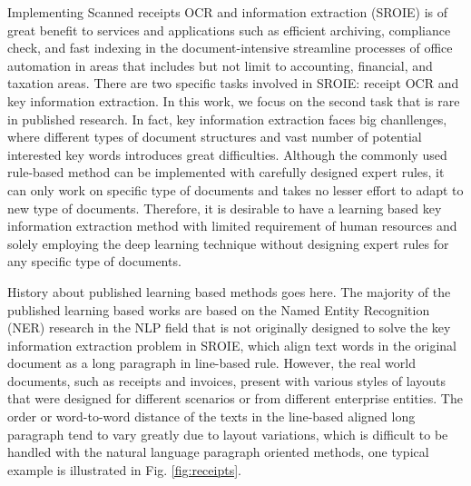 \documentclass[10pt,twocolumn,letterpaper]{article}
\begin{document}
Implementing Scanned receipts OCR and information extraction (SROIE) is of great benefit to services and applications such as efficient archiving, compliance check, and fast indexing in the document-intensive streamline processes of office automation in areas that includes but not limit to accounting, financial, and taxation areas. There are two specific tasks involved in SROIE: receipt OCR and key information extraction. In this work, we focus on the second task that is rare in published research. In fact, key information extraction faces big chanllenges, where different types of document structures and vast number of potential interested key words introduces great difficulties. Although the commonly used rule-based method can be implemented with carefully designed expert rules, it can only work on specific type of documents and takes no lesser effort to adapt to new type of documents. Therefore, it is desirable to have a learning based key information extraction method with limited requirement of human resources and solely employing the deep learning technique without designing expert rules for any specific type of documents. 

History about published learning based methods goes here.
The majority of the published learning based works are based on the Named Entity Recognition (NER) research in the NLP field that is not originally designed to solve the key information extraction problem in SROIE, which align text words in the original document as a long paragraph in line-based rule. However, the real world documents, such as receipts and invoices, present with various styles of layouts that were designed for different scenarios or from different enterprise entities. The order or word-to-word distance of the texts in the line-based aligned long paragraph tend to vary greatly due to layout variations, which is difficult to be handled with the natural language paragraph oriented methods, one typical example is illustrated in Fig. \ref{fig:receipts}.
\end{document}
